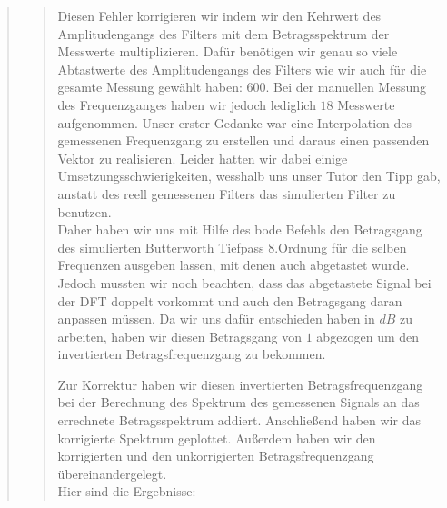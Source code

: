 \begin{quote}
\begin{quote}
        \vspace{1em}
        
        Diesen Fehler korrigieren wir indem wir den Kehrwert des Amplitudengangs des Filters mit dem Betragsspektrum der
        Messwerte multiplizieren. Dafür benötigen wir genau so viele Abtastwerte
        des Amplitudengangs des Filters wie wir auch für die gesamte Messung gewählt haben: $600$. 
        Bei der manuellen Messung des Frequenzganges haben wir jedoch
        lediglich $18$ Messwerte aufgenommen. Unser erster Gedanke war eine Interpolation des gemessenen Frequenzgang zu
        erstellen und daraus einen passenden Vektor zu realisieren. Leider
        hatten wir dabei einige Umsetzungsschwierigkeiten, wesshalb uns unser
        Tutor den Tipp gab, anstatt des reell gemessenen Filters das simulierten
        Filter zu benutzen.\\
        Daher haben wir uns mit Hilfe des bode Befehls den Betragsgang des simulierten Butterworth Tiefpass 8.Ordnung
        für die selben Frequenzen ausgeben lassen, mit denen auch abgetastet
        wurde. Jedoch mussten wir noch beachten, dass das abgetastete Signal bei der DFT doppelt vorkommt 
        und auch den Betragsgang daran anpassen müssen. Da wir
        uns dafür entschieden haben in $dB$ zu arbeiten, haben wir diesen
        Betragsgang von $1$ abgezogen um den invertierten Betragsfrequenzgang zu bekommen.\vspace{1em}
        
        Zur Korrektur haben wir diesen invertierten Betragsfrequenzgang bei der
        Berechnung des Spektrum des gemessenen Signals an das errechnete
        Betragsspektrum addiert. Anschließend haben wir das korrigierte Spektrum geplottet.
        Außerdem haben wir den korrigierten und den unkorrigierten Betragsfrequenzgang übereinandergelegt.\\
        Hier sind die Ergebnisse:\\
        

\end{quote}
\end{quote}
